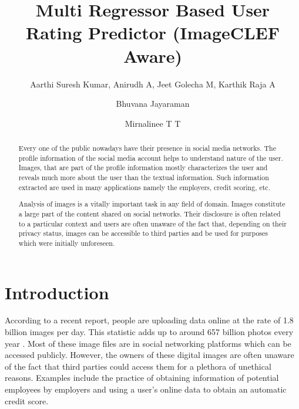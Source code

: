 \documentclass{llncs}
\begin{document}


\title{Multi Regressor Based User Rating Predictor (ImageCLEF Aware)}


\author{ Aarthi Suresh Kumar, Anirudh A, Jeet Golecha M, Karthik Raja A \and Bhuvana Jayaraman  \and Mirnalinee T T }


\maketitle
\begin{abstract}
Every one of the public nowadays have their presence in social media networks.  The profile information of the social media account helps to understand nature of  the user. Images, that  are part of the profile information mostly characterizes  the user and reveals much more about the user than the textual information. Such information extracted are used in many applications namely the  employers, credit scoring, etc.\cite{li2017neural}



Analysis of images is a vitally important task in any field of domain.
Images constitute a large part of the content shared on social networks. Their disclosure is often related to a particular context and users are often unaware of the fact that, depending on their privacy status, images can be accessible to third parties and be used for purposes which were initially unforeseen.

\end{abstract}

\section{Introduction}  
According to a recent report, people are uploading data online at the rate of 1.8 billion images per day.  This statistic adds up to around 657 billion photos\cite{nguyen2022unveiling} every year \cite{photoNum}. Most of these image files are in social networking platforms which can be accessed publicly. However, the owners of these digital images are often unaware of the fact that third parties could access them for a plethora of unethical reasons. Examples include the practice of obtaining information of potential employees by employers and using a user's online data to obtain an automatic credit score. 
\end{document}
